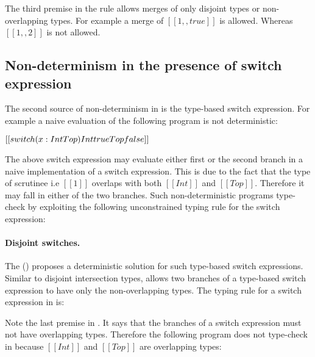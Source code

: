 \begin{center}
\end{center}

\noindent The third premise in the rule allows merges of only
disjoint types or non-overlapping types.
For example a merge of $[[1,,true]]$ is allowed.
Whereas $[[1,,2]]$ is not allowed.


\subsection{Non-determinism in the presence of switch expression}

The second source of non-determinism in \namems is the
type-based switch expression.
For example a naive evaluation of the following program is
not deterministic:

\begin{center}
$[[switch (x:Int\/Top) Int true Top false]]$
\end{center}

\noindent The above switch expression may evaluate either first or the
second branch in a naive implementation of a switch
expression. This is due to the fact that the type of scrutinee i.e $[[1]]$ overlaps
with both $[[Int]]$ and $[[Top]]$. Therefore it may fall in either of
the two branches. Such non-deterministic programs type-check
by exploiting the following unconstrained typing rule for the switch expression:

\begin{center}
\end{center}

\paragraph{Disjoint switches.}
The \name () proposes a deterministic 
solution for such type-based switch expressions.
Similar to disjoint intersection types, \name allows two branches
of a type-based switch expression to have only the
non-overlapping types. The typing rule for a switch expression
in \name is:

\begin{center}
\end{center}

\noindent Note the last premise in . It says that the branches of
a switch expression must not have overlapping types.
Therefore the following program does not type-check in \name
because $[[Int]]$ and $[[Top]]$ are overlapping types:


